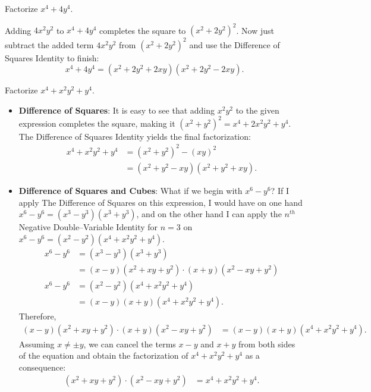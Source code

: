 \documentclass[12pt,a4paper]{memoir}
\theoremstyle{definition}
\begin{document}
\begin{tcolorbox}
	\begin{question}[name=(Sophie Germain Identity)]
		Factorize $x^4+4y^4$.
	\end{question}
\end{tcolorbox}

\begin{solution}[name=Solution by Sophie Germain]
	Adding $4x^2y^2$ to $x^4+4y^4$ completes the square to $(x^2+2y^2)^2$. Now just subtract the added term $4x^2y^2$ from $(x^2+2y^2)^2$ and use the Difference of Squares Identity to finish:
	$$x^4+4y^4 = (x^2+2y^2+2xy)(x^2+2y^2-2xy).$$
\end{solution}


\begin{tcolorbox}
	\begin{question}[name=(Sophie Parker Identity)]
		Factorize $x^4+x^2y^2+y^4$.
	\end{question}
\end{tcolorbox}

\begin{solution}[name=Solution by Sophie Parker]
	
	\begin{itemize}
		\item \textbf{Difference of Squares}: It is easy to see that adding $x^2y^2$ to the given expression completes the square, making it
		$(x^2+y^2)^2 = x^4+2x^2y^2+y^4$. The Difference of Squares Identity yields the final factorization:
		\begin{align*}
			x^4+x^2y^2+y^4 &= (x^2+y^2)^2 - (xy)^2\\ &=(x^2+y^2-xy)(x^2+y^2+xy).
		\end{align*}
		
		\item \textbf{Difference of Squares and Cubes}: What if we begin with $x^6-y^6$? If I apply The Difference of Squares on this expression, I would have on one hand $x^6-y^6=(x^3-y^3)(x^3+y^3)$, and on the other hand I can apply the $n^{th}$ Negative Double--Variable Identity for $n=3$ on $x^6-y^6= (x^2-y^2)(x^4+x^2y^2+y^4)$.
		\begin{align*}
			x^6 - y^6 &= (x^3-y^3)(x^3+y^3)\\
			&= (x-y)(x^2+xy+y^2)\cdot (x+y)(x^2-xy+y^2)\\
			x^6 - y^6 &= (x^2-y^2)(x^4+x^2y^2+y^4)\\
			&= (x-y)(x+y)(x^4+x^2y^2+y^4).
		\end{align*}
		Therefore,
		\begin{align*}
			(x-y)(x^2+xy+y^2)\cdot (x+y)(x^2-xy+y^2) &= (x-y)(x+y)(x^4+x^2y^2+y^4).
		\end{align*}
		Assuming $x\neq \pm y$, we can cancel the terms $x-y$ and $x+y$ from both sides of the equation and obtain the factorization of $x^4+x^2y^2+y^4$ as a consequence:
		\begin{align*}
			(x^2+xy+y^2)\cdot(x^2-xy+y^2) &= x^4+x^2y^2+y^4.
		\end{align*}
	\end{itemize}
\end{solution}
\end{document}
